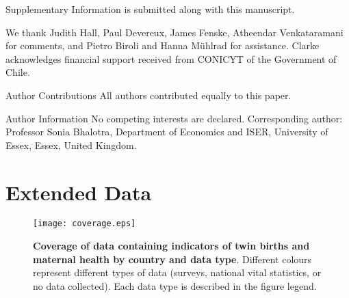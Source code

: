 \documentclass{nature}
\begin{document}
\begin{linenumbers}



\clearpage


\clearpage
\begin{addendum}
 \item[Supplementary Information] is submitted along with this manuscript.
 \item We thank Judith Hall, Paul Devereux, James Fenske, Atheendar Venkataramani for comments, and Pietro Biroli and Hanna M\"uhlrad for assistance.  Clarke acknowledges financial support received from CONICYT of the Government of Chile.
 \item[Author Contributions] All authors contributed equally to this paper.
 \item[Author Information] No competing interests are declared.  Corresponding author: Professor Sonia Bhalotra, Department of Economics and ISER, University of Essex, Essex, United Kingdom.
\end{addendum}

\clearpage
\section{Extended Data}
\setcounter{figure}{0}
\setcounter{table}{0}
\renewcommand{\tablename}{Extended Data Table}
\renewcommand{\figurename}{Extended Data Figure}
\begin{spacing}{1}
\begin{figure}[htpb!]
\texttt{[image: coverage.eps]}
\caption{\textbf{Coverage of data containing indicators of twin births and maternal health by country and data type}. {\footnotesize  Different colours represent different types of data (surveys, national vital statistics, or no data collected).  Each data type is described in the figure legend.}}
\label{fig:twincoverage}
\end{figure}



\end{spacing}
\end{linenumbers}
\end{document}
